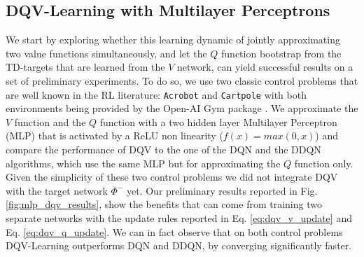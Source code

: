 \subsection{DQV-Learning with Multilayer Perceptrons}
We start by exploring whether this learning dynamic of jointly approximating two value functions simultaneously, and let the $Q$ function bootstrap from the TD-targets that are learned from the $V$ network, can yield successful results on a set of preliminary experiments. To do so, we use two classic control problems that are well known in the RL literature: \texttt{Acrobot} \cite{sutton1996generalization} and \texttt{Cartpole} \cite{barto1983neuronlike} with both environments being provided by the Open-AI Gym package \cite{brockman2016openai}. We approximate the $V$ function and the $Q$ function with a two hidden layer Multilayer Perceptron (MLP) that is activated by a ReLU non linearity ($f(x) = max (0,x)$) and compare the performance of DQV to the one of the DQN and the DDQN algorithms, which use the same MLP but for approximating the $Q$ function only. Given the simplicity of these two control problems we did not integrate DQV with the target network $\Phi^{-}$ yet. Our preliminary results reported in Fig. \ref{fig:mlp_dqv_results}, show the benefits that can come from training two separate networks with the update rules reported in Eq. \ref{eq:dqv_v_update} and Eq. \ref{eq:dqv_q_update}. We can in fact observe that on both control problems DQV-Learning outperforms DQN and DDQN, by converging significantly faster. 




